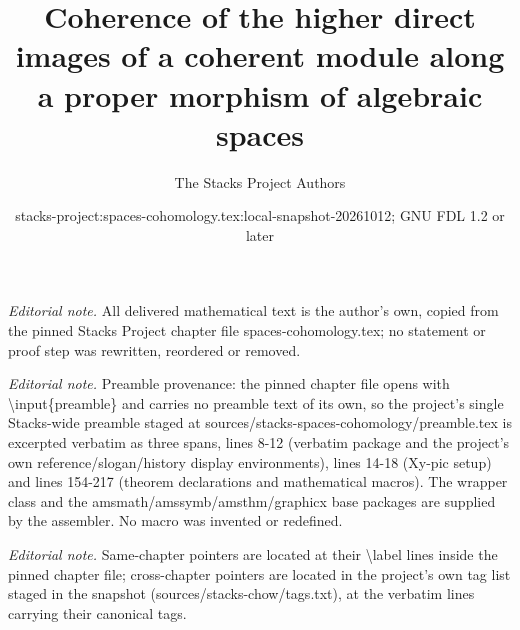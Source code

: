\documentclass[10pt,a4paper]{amsart}
\title{Coherence of the higher direct images of a coherent module along a proper morphism of algebraic spaces}
\author{The Stacks Project Authors}
\date{stacks-project:spaces-cohomology.tex:local-snapshot-20261012; GNU FDL 1.2 or later}
\theoremstyle{plain}
\theoremstyle{definition}
\theoremstyle{remark}
\numberwithin{equation}{subsection}
\begin{document}
\maketitle
\noindent\textit{Editorial note.} All delivered mathematical text is the author's own, copied from the pinned Stacks Project chapter file spaces-cohomology.tex; no statement or proof step was rewritten, reordered or removed.\par\medskip
\noindent\textit{Editorial note.} Preamble provenance: the pinned chapter file opens with \textbackslash{}input\{preamble\} and carries no preamble text of its own, so the project's single Stacks-wide preamble staged at sources/stacks-spaces-cohomology/preamble.tex is excerpted verbatim as three spans, lines 8-12 (verbatim package and the project's own reference/slogan/history display environments), lines 14-18 (Xy-pic setup) and lines 154-217 (theorem declarations and mathematical macros). The wrapper class and the amsmath/amssymb/amsthm/graphicx base packages are supplied by the assembler. No macro was invented or redefined.\par\medskip
\noindent\textit{Editorial note.} Same-chapter pointers are located at their \textbackslash{}label lines inside the pinned chapter file; cross-chapter pointers are located in the project's own tag list staged in the snapshot (sources/stacks-chow/tags.txt), at the verbatim lines carrying their canonical tags.\par\medskip
\end{document}

